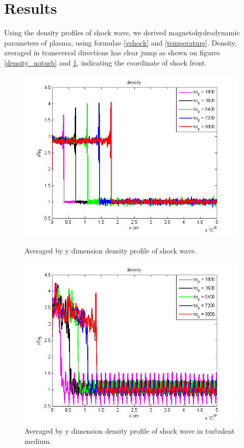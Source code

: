 \documentclass[a4paper]{jpconf}
\begin{document}
\section{Results}
Using the density profiles of shock wave, we derived magnetohydrodynamic parameters of plasma, using formulae \ref{vshock} and \ref{temperature}. Density, averaged in transversal directions  has clear jump as shown on figures \ref{density_noturb} and \ref{density_turb}, indicating the coordinate of shock front.

\begin{figure}[h!]
	\centering
	\begin{minipage}{0.5\textwidth}
		\centering
		\includegraphics[width=0.98\textwidth]{fig/density_noturb.png} 
		\caption{Averaged by y dimension density profile of shock wave.}
		\label{density_noturb}
	\end{minipage}\hfill
	\begin{minipage}{0.5\textwidth}
		\centering
		\includegraphics[width=0.98\textwidth]{fig/density_turb.png} 
		\caption{Averaged by y dimension density profile of shock wave in turbulent medium.}
		\label{density_turb}
	\end{minipage}
\end{figure}
\end{document}
